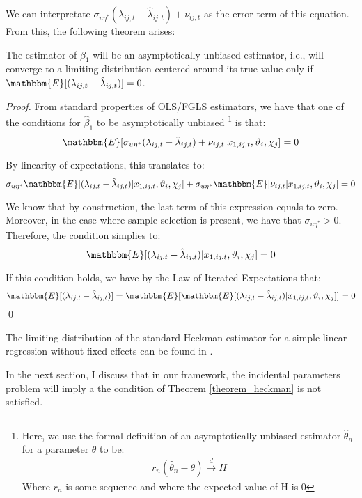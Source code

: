 We can interpretate $\sigma_{u\eta^*} ({\lambda}_{ij,t} - \hat{\lambda}_{ij,t}) + \nu_{ij,t}$ as the error term of this equation. From this, the following theorem arises:
\begin{theorem} \label{theorem_heckman}
    The estimator of $\beta_1$ will be an asymptotically unbiased estimator, i.e., will converge to a limiting distribution centered around its true value only if $\mathbbm{E} [ ({\lambda}_{ij,t} - \hat{\lambda}_{ij,t}) ] = 0$.
\end{theorem}
\textit{Proof.} From standard properties of OLS/FGLS estimators, we have that one of the conditions for $\hat{\beta}_1$ to be asymptotically unbiased \footnote{Here, we use the formal definition of an asymptotically unbiased estimator $\hat{\theta}_n$ for a parameter $\theta$ to be: 
\begin{align}
    r_n (\hat{\theta}_n - \theta) \xrightarrow{d} H
\end{align}
Where $r_n$ is some sequence and where the expected value of H is 0} is that:
$$ \mathbbm{E} [\sigma_{u\eta^*} ({\lambda}_{ij,t} - \hat{\lambda}_{ij,t}) + \nu_{ij,t} \rvert x_{1,ij,t}, \vartheta_i, \chi_j] = 0 $$

By linearity of expectations, this translates to:
$$ \sigma_{u\eta^*} \mathbbm{E} [ ({\lambda}_{ij,t} - \hat{\lambda}_{ij,t}) \rvert x_{1,ij,t}, \vartheta_i, \chi_j] + \sigma_{u\eta^*} \mathbbm{E} [\nu_{ij,t} \rvert x_{1,ij,t}, \vartheta_i, \chi_j] = 0 $$

We know that by construction, the last term of this expression equals to zero. Moreover, in the case where sample selection is present, we have that $\sigma_{u\eta^*} > 0$. Therefore, the condition simplies to:
$$\mathbbm{E} [ ({\lambda}_{ij,t} - \hat{\lambda}_{ij,t}) \rvert x_{1,ij,t}, \vartheta_i, \chi_j] = 0$$

If this condition holds, we have by the Law of Iterated Expectations that:
$$\mathbbm{E} [ ({\lambda}_{ij,t} - \hat{\lambda}_{ij,t}) ] =  \mathbbm{E} [\mathbbm{E}[({\lambda}_{ij,t} - \hat{\lambda}_{ij,t})\rvert x_{1,ij,t}, \vartheta_i, \chi_j]] = 0$$ \qed

The limiting distribution of the standard Heckman estimator for a simple linear regression without fixed effects can be found in \cite{helpman2008estimating}. 

In the next section, I discuss that in our framework, the incidental parameters problem will imply a the condition of Theorem \ref{theorem_heckman} is not satisfied.

